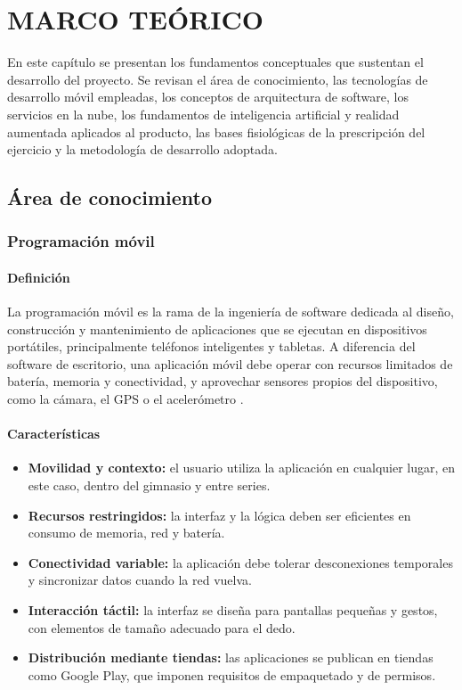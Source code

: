 \chapter{MARCO TEÓRICO}
\label{cap:marco}

En este capítulo se presentan los fundamentos conceptuales que sustentan el
desarrollo del proyecto. Se revisan el área de conocimiento, las tecnologías de
desarrollo móvil empleadas, los conceptos de arquitectura de software, los
servicios en la nube, los fundamentos de inteligencia artificial y realidad
aumentada aplicados al producto, las bases fisiológicas de la prescripción del
ejercicio y la metodología de desarrollo adoptada.

\section{Área de conocimiento}
\label{sec:mt-area}

\subsection{Programación móvil}

\subsubsection*{Definición}

La programación móvil es la rama de la ingeniería de software dedicada al
diseño, construcción y mantenimiento de aplicaciones que se ejecutan en
dispositivos portátiles, principalmente teléfonos inteligentes y tabletas.
A diferencia del software de escritorio, una aplicación móvil debe operar con
recursos limitados de batería, memoria y conectividad, y aprovechar sensores
propios del dispositivo, como la cámara, el GPS o el acelerómetro
\citep{sommerville2011}.

\subsubsection*{Características}

\begin{itemize}
    \item \textbf{Movilidad y contexto:} el usuario utiliza la aplicación en
    cualquier lugar, en este caso, dentro del gimnasio y entre series.
    \item \textbf{Recursos restringidos:} la interfaz y la lógica deben ser
    eficientes en consumo de memoria, red y batería.
    \item \textbf{Conectividad variable:} la aplicación debe tolerar
    desconexiones temporales y sincronizar datos cuando la red vuelva.
    \item \textbf{Interacción táctil:} la interfaz se diseña para pantallas
    pequeñas y gestos, con elementos de tamaño adecuado para el dedo.
    \item \textbf{Distribución mediante tiendas:} las aplicaciones se publican
    en tiendas como Google Play, que imponen requisitos de empaquetado y de
    permisos.
\end{itemize}

